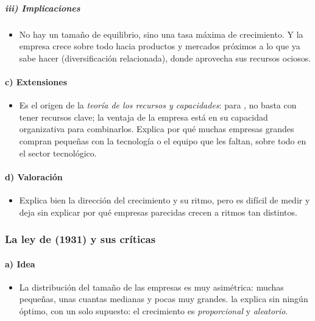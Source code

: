 \documentclass[11pt]{article}
\begin{document}
\subparagraph{iii) Implicaciones}

\begin{itemize}
\item No hay un tamaño de equilibrio, sino una tasa máxima de crecimiento. Y la empresa crece sobre todo hacia productos y mercados próximos a lo que ya sabe hacer (diversificación relacionada), donde aprovecha sus recursos ociosos.
\end{itemize}

\paragraph{c) Extensiones}

\begin{itemize}
\item Es el origen de la \emph{teoría de los recursos y capacidades}: para \textcite{Wernerfelt1984Resource}, no basta con tener recursos clave; la ventaja de la empresa está en su capacidad organizativa para combinarlos. Explica por qué muchas empresas grandes compran pequeñas con la tecnología o el equipo que les faltan, sobre todo en el sector tecnológico.
\end{itemize}

\paragraph{d) Valoración}

\begin{itemize}
\item Explica bien la dirección del crecimiento y su ritmo, pero es difícil de medir y deja sin explicar por qué empresas parecidas crecen a ritmos tan distintos.
\end{itemize}

\subsubsection{La ley de  (1931) y sus críticas}\label{sec:gibrat}

\paragraph{a) Idea}

\begin{itemize}
\item La distribución del tamaño de las empresas es muy asimétrica: muchas pequeñas, unas cuantas medianas y pocas muy grandes. \textcite{Gibrat1931Inegalites} la explica sin ningún óptimo, con un solo supuesto: el crecimiento es \emph{proporcional} y \emph{aleatorio}.
\end{itemize}
\end{document}
